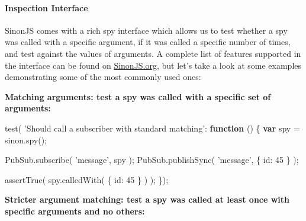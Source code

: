 \documentclass[9pt]{book}
\newenvironment{Shaded}{}{}
\newcommand{\KeywordTok}[1]{\textcolor[rgb]{0.00,0.44,0.13}{\textbf{{#1}}}}
\newcommand{\DataTypeTok}[1]{\textcolor[rgb]{0.56,0.13,0.00}{{#1}}}
\newcommand{\DecValTok}[1]{\textcolor[rgb]{0.25,0.63,0.44}{{#1}}}
\newcommand{\StringTok}[1]{\textcolor[rgb]{0.25,0.44,0.63}{{#1}}}
\newcommand{\OtherTok}[1]{\textcolor[rgb]{0.00,0.44,0.13}{{#1}}}
\newcommand{\FunctionTok}[1]{\textcolor[rgb]{0.02,0.16,0.49}{{#1}}}
\newcommand{\NormalTok}[1]{{#1}}
\begin{document}
\paragraph{Inspection Interface}\label{inspection-interface}

SinonJS comes with a rich spy interface which allows us to test whether
a spy was called with a specific argument, if it was called a specific
number of times, and test against the values of arguments. A complete
list of features supported in the interface can be found on
\href{http://sinonjs.org/docs/}{SinonJS.org}, but let's take a look at
some examples demonstrating some of the most commonly used ones:

\textbf{Matching arguments: test a spy was called with a specific set of
arguments:}

\begin{Shaded}
\begin{Highlighting}[]
\FunctionTok{test}\NormalTok{( }\StringTok{'Should call a subscriber with standard matching'}\NormalTok{: }\KeywordTok{function} \NormalTok{() \{}
    \KeywordTok{var} \NormalTok{spy = }\OtherTok{sinon}\NormalTok{.}\FunctionTok{spy}\NormalTok{();}

    \OtherTok{PubSub}\NormalTok{.}\FunctionTok{subscribe}\NormalTok{( }\StringTok{'message'}\NormalTok{, spy );}
    \OtherTok{PubSub}\NormalTok{.}\FunctionTok{publishSync}\NormalTok{( }\StringTok{'message'}\NormalTok{, \{ }\DataTypeTok{id}\NormalTok{: }\DecValTok{45} \NormalTok{\} );}

    \FunctionTok{assertTrue}\NormalTok{( }\OtherTok{spy}\NormalTok{.}\FunctionTok{calledWith}\NormalTok{( \{ }\DataTypeTok{id}\NormalTok{: }\DecValTok{45} \NormalTok{\} ) );}
\NormalTok{\});}
\end{Highlighting}
\end{Shaded}

\textbf{Stricter argument matching: test a spy was called at least once
with specific arguments and no others:}
\end{document}
